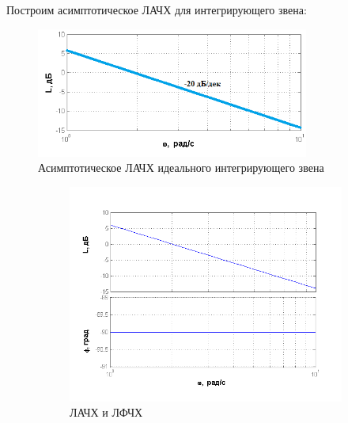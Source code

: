 \documentclass[a4paper, 11pt, russian]{article}
\begin{document}
    Построим асимптотическое ЛАЧХ для интегрирующего звена:
    \begin{figure}[ht!]
        \centering
        \includegraphics[width = 0.8\textwidth]{integratingLinkAsymp}
        \caption{Асимптотическое ЛАЧХ идеального интегрирующего звена}
    \end{figure}
    \begin{figure}[ht!]
        \centering
        \begin{subfigure}[h]{0.49\textwidth}
            \includegraphics[width = \textwidth]{integratingLinkBode}
            \caption{ЛАЧХ и ЛФЧХ}
        \end{subfigure}
        \hfill
        \begin{subfigure}[h]{0.49\textwidth}

\end{subfigure}
\end{figure}
\end{document}
